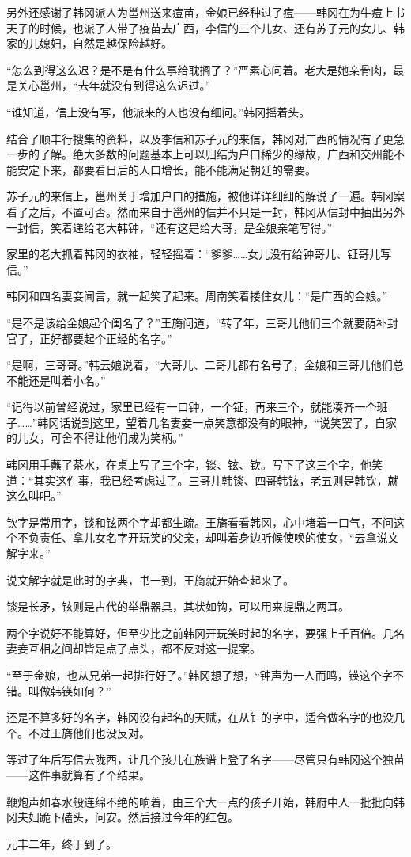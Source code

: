 另外还感谢了韩冈派人为邕州送来痘苗，金娘已经种过了痘——韩冈在为牛痘上书天子的时候，也派了人带了疫苗去广西，李信的三个儿女、还有苏子元的女儿、韩家的儿媳妇，自然是越保险越好。

“怎么到得这么迟？是不是有什么事给耽搁了？”严素心问着。老大是她亲骨肉，最是关心邕州，“去年就没有到得这么迟过。”

“谁知道，信上没有写，他派来的人也没有细问。”韩冈摇着头。

结合了顺丰行搜集的资料，以及李信和苏子元的来信，韩冈对广西的情况有了更急一步的了解。绝大多数的问题基本上可以归结为户口稀少的缘故，广西和交州能不能安定下来，都要看日后的人口增长，能不能满足朝廷的需要。

苏子元的来信上，邕州关于增加户口的措施，被他详详细细的解说了一遍。韩冈案看了之后，不置可否。然而来自于邕州的信并不只是一封，韩冈从信封中抽出另外一封信，笑着递给老大韩钟，“还有这是给大哥，是金娘亲笔写得。”

家里的老大抓着韩冈的衣袖，轻轻摇着：“爹爹……女儿没有给钟哥儿、钲哥儿写信。”

韩冈和四名妻妾闻言，就一起笑了起来。周南笑着搂住女儿：“是广西的金娘。”

“是不是该给金娘起个闺名了？”王旖问道，“转了年，三哥儿他们三个就要荫补封官了，正好都要起个正经的名字。”

“是啊，三哥哥。”韩云娘说着，“大哥儿、二哥儿都有名号了，金娘和三哥儿他们总不能还是叫着小名。”

“记得以前曾经说过，家里已经有一口钟，一个钲，再来三个，就能凑齐一个班子……”韩冈话说到这里，望着几名妻妾一点笑意都没有的眼神，“说笑罢了，自家的儿女，可舍不得让他们成为笑柄。”

韩冈用手蘸了茶水，在桌上写了三个字，锬、铉、钦。写下了这三个字，他笑道：“其实这件事，我已经考虑过了。三哥儿韩锬、四哥韩铉，老五则是韩钦，就这么叫吧。”

钦字是常用字，锬和铉两个字却都生疏。王旖看看韩冈，心中堵着一口气，不问这个不负责任、拿儿女名字开玩笑的父亲，却叫着身边听候使唤的使女，“去拿说文解字来。”

说文解字就是此时的字典，书一到，王旖就开始查起来了。

锬是长矛，铉则是古代的举鼎器具，其状如钩，可以用来提鼎之两耳。

两个字说好不能算好，但至少比之前韩冈开玩笑时起的名字，要强上千百倍。几名妻妾互相之间却皆是点了点头，都不反对这一提案。

“至于金娘，也从兄弟一起排行好了。”韩冈想了想，“钟声为一人而鸣，锳这个字不错。叫做韩锳如何？”

还是不算多好的名字，韩冈没有起名的天赋，在从钅的字中，适合做名字的也没几个。不过王旖他们也没反对。

等过了年后写信去陇西，让几个孩儿在族谱上登了名字——尽管只有韩冈这个独苗——这件事就算有了个结果。

鞭炮声如春水般连绵不绝的响着，由三个大一点的孩子开始，韩府中人一批批向韩冈夫妇跪下磕头，问安。然后接过今年的红包。

元丰二年，终于到了。

